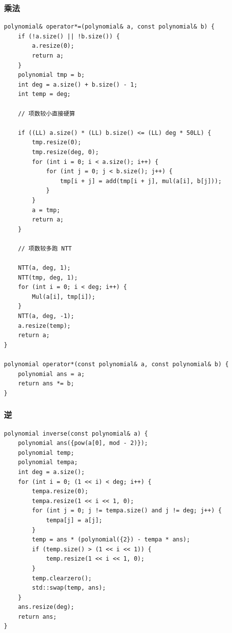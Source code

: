 \documentclass[UTF8, a4paper, titlepage, twoside]{ctexart}
\begin{document}
\subsubsection*{ 乘法 }
\begin{lstlisting}[style=cpp]
polynomial& operator*=(polynomial& a, const polynomial& b) {
    if (!a.size() || !b.size()) {
        a.resize(0);
        return a;
    }
    polynomial tmp = b;
    int deg = a.size() + b.size() - 1;
    int temp = deg;

    // 项数较小直接硬算

    if ((LL) a.size() * (LL) b.size() <= (LL) deg * 50LL) {
        tmp.resize(0);
        tmp.resize(deg, 0);
        for (int i = 0; i < a.size(); i++) {
            for (int j = 0; j < b.size(); j++) {
                tmp[i + j] = add(tmp[i + j], mul(a[i], b[j]));
            }
        }
        a = tmp;
        return a;
    }

    // 项数较多跑 NTT

    NTT(a, deg, 1);
    NTT(tmp, deg, 1);
    for (int i = 0; i < deg; i++) {
        Mul(a[i], tmp[i]);
    }
    NTT(a, deg, -1);
    a.resize(temp);
    return a;
}

polynomial operator*(const polynomial& a, const polynomial& b) {
    polynomial ans = a;
    return ans *= b;
}
\end{lstlisting}

\subsubsection*{ 逆 }
\begin{lstlisting}[style=cpp]
polynomial inverse(const polynomial& a) {
    polynomial ans({pow(a[0], mod - 2)});
    polynomial temp;
    polynomial tempa;
    int deg = a.size();
    for (int i = 0; (1 << i) < deg; i++) {
        tempa.resize(0);
        tempa.resize(1 << i << 1, 0);
        for (int j = 0; j != tempa.size() and j != deg; j++) {
            tempa[j] = a[j];
        }
        temp = ans * (polynomial({2}) - tempa * ans);
        if (temp.size() > (1 << i << 1)) {
            temp.resize(1 << i << 1, 0);
        }
        temp.clearzero();
        std::swap(temp, ans);
    }
    ans.resize(deg);
    return ans;
}
\end{lstlisting}
\end{document}
